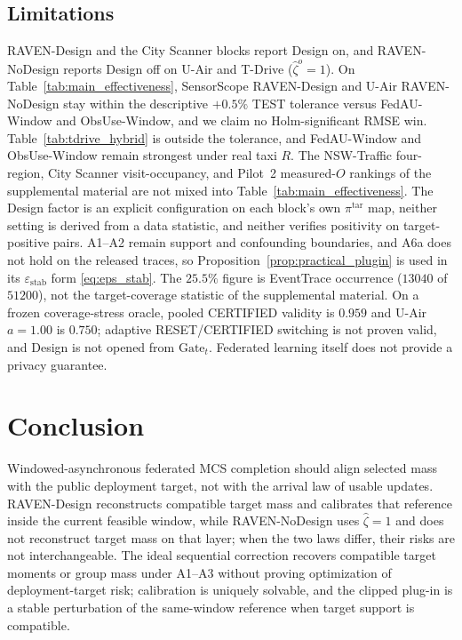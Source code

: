 \documentclass[letterpaper,journal]{IEEEtran}
\begin{document}
\subsection{Limitations}
\label{subsec:limitations}

RAVEN-Design and the City Scanner blocks report Design on, and RAVEN-NoDesign
reports Design off on U-Air and T-Drive ($\widehat\zeta^{o}=1$).  On
Table~\ref{tab:main_effectiveness}, SensorScope RAVEN-Design and U-Air
RAVEN-NoDesign stay within the descriptive $+0.5\%$ TEST tolerance versus
FedAU-Window and ObsUse-Window, and we claim no Holm-significant RMSE win.
Table~\ref{tab:tdrive_hybrid} is outside the tolerance,
and FedAU-Window and ObsUse-Window remain strongest under real taxi $R$.  The
NSW-Traffic four-region, City Scanner visit-occupancy, and Pilot~2 measured-$O$
rankings of the supplemental material are not mixed into
Table~\ref{tab:main_effectiveness}.  The Design factor is an explicit
configuration on each block's own $\pi^{\mathrm{tar}}$ map, neither setting is
derived from a data statistic, and neither verifies positivity on
target-positive pairs.  A1--A2 remain support and confounding boundaries, and
A6a does not hold on the released traces, so
Proposition~\ref{prop:practical_plugin} is used in its
$\varepsilon_{\mathrm{stab}}$ form \eqref{eq:eps_stab}.  The $25.5\%$ figure is
EventTrace occurrence ($13040$ of $51200$), not the target-coverage statistic of
the supplemental material.  On a frozen coverage-stress oracle, pooled CERTIFIED
validity is $0.959$ and U-Air $a=1.00$ is $0.750$; adaptive RESET/CERTIFIED
switching is not proven valid, and Design is not opened from
$\mathrm{Gate}_t$.  Federated learning itself does not provide a privacy
guarantee.


\section{Conclusion}
\label{sec:conclusion}

Windowed-asynchronous federated MCS completion should align selected mass
with the public deployment target, not with the arrival law of usable
updates.  RAVEN-Design reconstructs compatible target mass and calibrates that
reference inside the current feasible window, while RAVEN-NoDesign uses
$\widehat\zeta=1$ and does not reconstruct target mass on that layer; when the
two laws differ, their risks are not interchangeable.  The ideal sequential
correction recovers compatible target moments or group mass under A1--A3 without
proving optimization of deployment-target risk; calibration is uniquely solvable,
and the clipped plug-in is a stable perturbation of the same-window reference
when target support is compatible.
\end{document}
